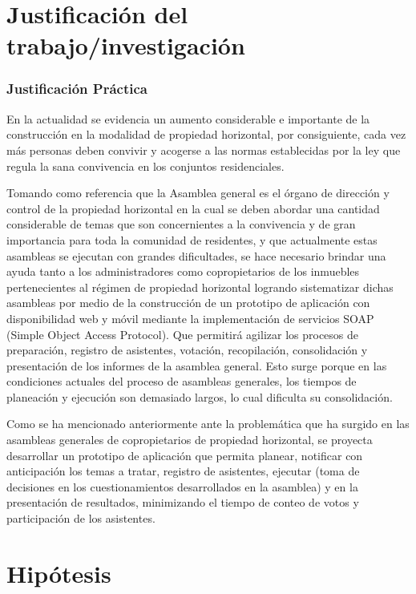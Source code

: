 \section{Justificación del trabajo/investigación}

\subsubsection{Justificación Práctica}

En la actualidad se evidencia un aumento considerable e importante de la construcción en la modalidad de propiedad horizontal, por consiguiente, cada vez más personas deben convivir y acogerse a las normas establecidas por la ley que regula la sana convivencia en los conjuntos residenciales. 

Tomando como referencia que la Asamblea general es el órgano de dirección y control de la propiedad horizontal en la cual se deben abordar una cantidad considerable de temas que son concernientes a la convivencia y de gran importancia para toda la comunidad de residentes,  y que actualmente estas asambleas se ejecutan con grandes dificultades, se hace necesario brindar una ayuda tanto a los administradores como copropietarios de los inmuebles pertenecientes al régimen de propiedad horizontal logrando sistematizar dichas asambleas por medio de la construcción de un prototipo de aplicación con disponibilidad web y móvil mediante la implementación de servicios SOAP (Simple Object Access Protocol).  Que permitirá agilizar los procesos de preparación, registro de asistentes, votación, recopilación, consolidación y presentación de los informes de la asamblea general. Esto surge porque en las condiciones actuales del proceso de asambleas generales, los tiempos de planeación y ejecución son demasiado largos, lo cual dificulta su consolidación.

Como se ha mencionado anteriormente ante la problemática que ha surgido en las asambleas generales de copropietarios de propiedad horizontal, se proyecta desarrollar un prototipo de aplicación que permita planear, notificar con anticipación los temas a tratar, registro de asistentes, ejecutar (toma de decisiones en los cuestionamientos desarrollados en la asamblea) y en la presentación de resultados, minimizando el tiempo de conteo de votos y participación de los asistentes.

\section{Hipótesis}

